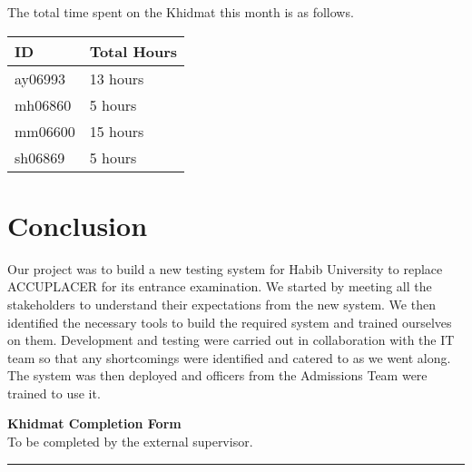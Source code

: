 \documentclass{article}
\begin{document}
The total time spent on the Khidmat this month is as follows.

\begin{tabular}{|l|l|}
  \hline
  ID      & Total Hours \\\hline\hline
  ay06993 & 13 hours    \\\hline
  mh06860 & 5 hours    \\\hline
  mm06600 & 15 hours     \\\hline
  sh06869 & 5 hours    \\\hline
\end{tabular}


\newpage
\section*{Conclusion}

Our project was to build a new testing system for Habib University to replace
ACCUPLACER for its entrance examination. We started by meeting all the
stakeholders to understand their expectations from the new system. We then
identified the necessary tools to build the required system and trained
ourselves on them. Development and testing were carried out in collaboration
with the IT team so that any shortcomings were identified and catered to as we
went along. The system was then deployed and officers from the Admissions Team
were trained to use it.

\newpage
\thispagestyle{empty}

\begin{center}
  {\Large\bf Khidmat Completion Form}\\[5pt]
  \small To be completed by the external supervisor.
\end{center}
\bigskip

\vfill

\begin{center}
  \rule{.8\textwidth}{.5pt}
\end{center}
\medskip
\end{document}
